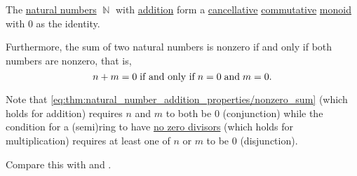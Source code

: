 \begin{proposition}\label{thm:natural_number_addition_properties}
  The \hyperref[def:set_of_natural_numbers]{natural numbers} \( \BbbN \) with \hyperref[def:peano_arithmetic/plus]{addition} form a \hyperref[def:magma/cancellative]{cancellative} \hyperref[def:magma/commutative]{commutative} \hyperref[def:unital_magma/associative]{monoid} with \( 0 \) as the identity.

  Furthermore, the sum of two natural numbers is nonzero if and only if both numbers are nonzero, that is,
  \begin{equation}\label{eq:thm:natural_number_addition_properties/nonzero_sum}
    n + m = 0 \T{if and only if} n = 0 \T{and} m = 0.
  \end{equation}

  Note that \eqref{eq:thm:natural_number_addition_properties/nonzero_sum} (which holds for addition) requires \( n \) and \( m \) to both be \( 0 \) (conjunction) while the condition for a (semi)ring to have \hyperref[def:semiring/no_zero_divisor]{no zero divisors} (which holds for multiplication) requires at least one of \( n \) or \( m \) to be \( 0 \) (disjunction).

  Compare this with  and .
\end{proposition}
